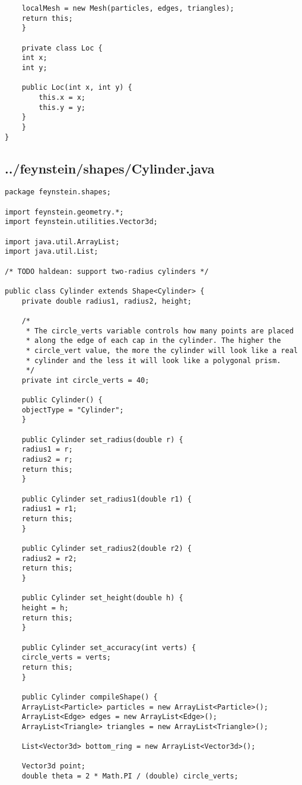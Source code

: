 \begin{lstlisting}
	localMesh = new Mesh(particles, edges, triangles);
	return this;
    }		

    private class Loc {
	int x;
	int y;

	public Loc(int x, int y) {
	    this.x = x;
	    this.y = y;
	}
    }
}\end{lstlisting}

\subsection*{../feynstein/shapes/Cylinder.java}
\begin{lstlisting}
package feynstein.shapes;

import feynstein.geometry.*;
import feynstein.utilities.Vector3d;

import java.util.ArrayList;
import java.util.List;

/* TODO haldean: support two-radius cylinders */

public class Cylinder extends Shape<Cylinder> {
    private double radius1, radius2, height;

    /*
     * The circle_verts variable controls how many points are placed
     * along the edge of each cap in the cylinder. The higher the
     * circle_vert value, the more the cylinder will look like a real
     * cylinder and the less it will look like a polygonal prism.
     */
    private int circle_verts = 40;

    public Cylinder() {
	objectType = "Cylinder";
    }
    
    public Cylinder set_radius(double r) {
	radius1 = r;
	radius2 = r;
	return this;
    }

    public Cylinder set_radius1(double r1) {
	radius1 = r1;
	return this;
    }

    public Cylinder set_radius2(double r2) {
	radius2 = r2;
	return this;
    }

    public Cylinder set_height(double h) {
	height = h;
	return this;
    }

    public Cylinder set_accuracy(int verts) {
	circle_verts = verts;
	return this;
    }

    public Cylinder compileShape() {
	ArrayList<Particle> particles = new ArrayList<Particle>();
	ArrayList<Edge> edges = new ArrayList<Edge>();
	ArrayList<Triangle> triangles = new ArrayList<Triangle>();

	List<Vector3d> bottom_ring = new ArrayList<Vector3d>();

	Vector3d point;
	double theta = 2 * Math.PI / (double) circle_verts;
	

\end{lstlisting}

